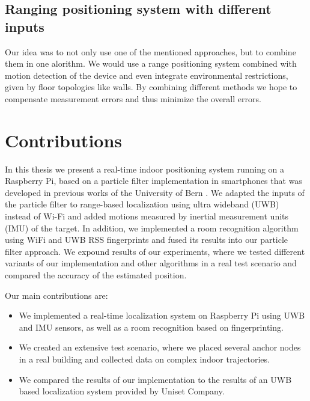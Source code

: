 \subsection{Ranging positioning system with different inputs}

Our idea was to not only use one of the mentioned approaches, but to combine them in one alorithm. We would use a range positioning system combined with motion detection of the device and even integrate environmental restrictions, given by floor topologies like walls. By combining different methods we hope to compensate measurement errors and thus minimize the overall errors.



\section{Contributions}

In this thesis we present a real-time indoor positioning system running on a Raspberry Pi, based on a particle filter implementation in smartphones that was developed in previous works of the University of Bern \cite{Carrera}. We adapted the inputs of the particle filter to range-based localization using ultra wideband (UWB) instead of Wi-Fi and added motions measured by inertial measurement units (IMU) of the target. In addition, we implemented a room recognition algorithm using WiFi and UWB RSS fingerprints and fused its results into our particle filter approach.
We expound results of our experiments, where we tested different variants of our implementation and other algorithms in a real test scenario and compared the accuracy of the estimated position.

Our main contributions are:
\begin{itemize}
\item We implemented a real-time localization system on Raspberry Pi using UWB and IMU sensors, as well as a room recognition based on fingerprinting. 
\item We created an extensive test scenario, where we placed several anchor nodes in a real building and collected data on complex indoor trajectories. 
\item We compared the results of our implementation to the results of an UWB based localization system provided by Uniset Company.
\end{itemize}



